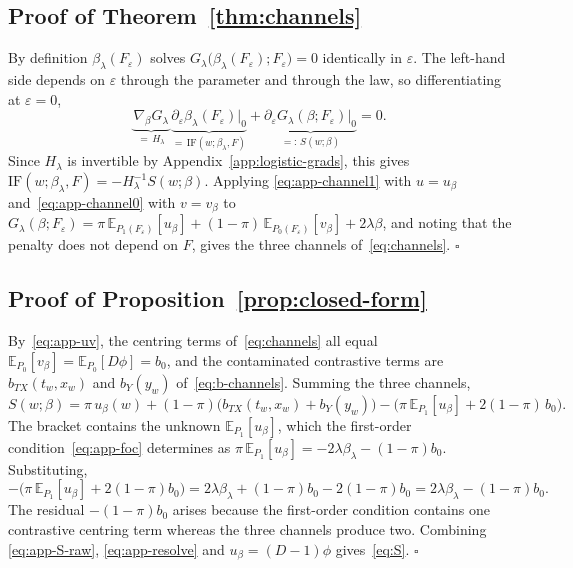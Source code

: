 \documentclass[11pt]{article}
\theoremstyle{plain}
\theoremstyle{definition}
\theoremstyle{remark}
\newcommand{\pE}{\ensuremath{\mathbb{E}}}
\newcommand{\ratio}{\ensuremath{\pi}}
\newcommand{\IF}{\mathrm{IF}}
\newcommand{\score}{S}
\begin{document}
\subsection{Proof of Theorem~\ref{thm:channels}}
\label{app:logistic-ift}

By definition $\beta_\lambda(F_\varepsilon)$ solves
$G_\lambda\big(\beta_\lambda(F_\varepsilon);F_\varepsilon\big) = 0$ identically in
$\varepsilon$. The left-hand side depends on $\varepsilon$ through the parameter and
through the law, so differentiating at $\varepsilon = 0$,
\begin{equation}
\underbrace{\nabla_\beta G_\lambda}_{=\,H_\lambda}\,
\underbrace{\partial_\varepsilon \beta_\lambda(F_\varepsilon)\big|_{0}}_{=\,\IF(w;\beta_\lambda,F)}
+ \underbrace{\partial_\varepsilon G_\lambda(\beta;F_\varepsilon)\big|_{0}}_{=:\,\score(w;\beta)}
= 0 .
\label{eq:app-ift}
\end{equation}
Since $H_\lambda$ is invertible by Appendix~\ref{app:logistic-grads}, this gives
$\IF(w;\beta_\lambda,F) = -H_\lambda^{-1}\score(w;\beta)$. Applying
\eqref{eq:app-channel1} with $u = u_\beta$ and~\eqref{eq:app-channel0} with
$v = v_\beta$ to
$G_\lambda(\beta;F_\varepsilon) = \ratio\,\pE_{P_1(F_\varepsilon)}[u_\beta]
+ (1-\ratio)\,\pE_{P_0(F_\varepsilon)}[v_\beta] + 2\lambda\beta$,
and noting that the penalty does not depend on $F$, gives the three channels
of~\eqref{eq:channels}. \hfill$\square$

\subsection{Proof of Proposition~\ref{prop:closed-form}}
\label{app:logistic-centering}

By~\eqref{eq:app-uv}, the centring terms of~\eqref{eq:channels} all equal
$\pE_{P_0}[v_\beta] = \pE_{P_0}[D\phi] = b_0$, and the contaminated contrastive terms are
$b_{TX}(t_w,x_w)$ and $b_Y(y_w)$ of~\eqref{eq:b-channels}. Summing the three channels,
\begin{equation}
\score(w;\beta)
= \ratio\,u_\beta(w) + (1-\ratio)\big( b_{TX}(t_w,x_w) + b_Y(y_w) \big)
- \Big( \ratio\,\pE_{P_1}[u_\beta] + 2(1-\ratio)\,b_0 \Big).
\label{eq:app-S-raw}
\end{equation}
The bracket contains the unknown $\pE_{P_1}[u_\beta]$, which the first-order
condition~\eqref{eq:app-foc} determines as
$\ratio\,\pE_{P_1}[u_\beta] = -2\lambda\beta_\lambda - (1-\ratio)b_0$. Substituting,
\begin{equation}
-\Big( \ratio\,\pE_{P_1}[u_\beta] + 2(1-\ratio)b_0 \Big)
= 2\lambda\beta_\lambda + (1-\ratio)b_0 - 2(1-\ratio)b_0
= 2\lambda\beta_\lambda - (1-\ratio)b_0 .
\label{eq:app-resolve}
\end{equation}
The residual $-(1-\ratio)b_0$ arises because the first-order condition contains one
contrastive centring term whereas the three channels produce two. Combining
\eqref{eq:app-S-raw}, \eqref{eq:app-resolve} and $u_\beta = (D-1)\phi$
gives~\eqref{eq:S}. \hfill$\square$
\end{document}
